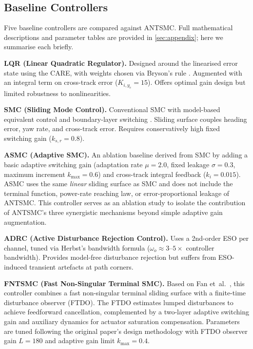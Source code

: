 \documentclass[review]{cas-dc}
\begin{document}
\subsection{Baseline Controllers}

Five baseline controllers are compared against ANTSMC. Full mathematical descriptions and parameter tables are provided in \ref{sec:appendix}; here we summarise each briefly.

\textbf{LQR (Linear Quadratic Regulator).} Designed around the linearised error state using the CARE, with weights chosen via Bryson's rule \citep{Bryson1975}. Augmented with an integral term on cross-track error ($K_{i,y_e} = 15$). Offers optimal gain design but limited robustness to nonlinearities.

\textbf{SMC (Sliding Mode Control).} Conventional SMC with model-based equivalent control and boundary-layer switching \citep{Utkin2009,Ashrafiuon2008}. Sliding surface couples heading error, yaw rate, and cross-track error. Requires conservatively high fixed switching gain ($k_{s,r} = 0.8$).

\textbf{ASMC (Adaptive SMC).} An ablation baseline derived from SMC by adding a basic adaptive switching gain (adaptation rate $\mu = 2.0$, fixed leakage $\sigma = 0.3$, maximum increment $k_{\max} = 0.6$) and cross-track integral feedback ($k_i = 0.015$). ASMC uses the same \emph{linear} sliding surface as SMC and does not include the terminal function, power-rate reaching law, or error-proportional leakage of ANTSMC. This controller serves as an ablation study to isolate the contribution of ANTSMC's three synergistic mechanisms beyond simple adaptive gain augmentation.

\textbf{ADRC (Active Disturbance Rejection Control).} Uses a 2nd-order ESO per channel, tuned via Herbst's bandwidth formula \citep{Herbst2013} ($\omega_o \approx 3$--$5\times$ controller bandwidth). Provides model-free disturbance rejection but suffers from ESO-induced transient artefacts at path corners.

\textbf{FNTSMC (Fast Non-Singular Terminal SMC).} Based on Fan et~al.\ \citep{Fan2021}, this controller combines a fast non-singular terminal sliding surface with a finite-time disturbance observer (FTDO). The FTDO estimates lumped disturbances to achieve feedforward cancellation, complemented by a two-layer adaptive switching gain and auxiliary dynamics for actuator saturation compensation. Parameters are tuned following the original paper's design methodology with FTDO observer gain $L = 180$ and adaptive gain limit $k_{\max} = 0.4$.
\end{document}

